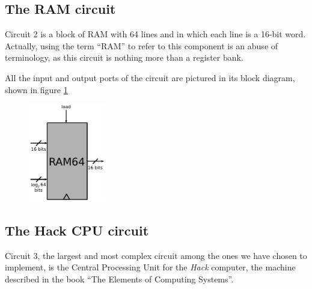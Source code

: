 \documentclass[a4paper]{article}
\begin{document}


        \subsection{The RAM circuit}
        \label{subsec:ram-circuit}
            Circuit 2 is a block of RAM with 64 lines and in which each line is a 16-bit word.
            Actually, using the term ``RAM'' to refer to this component is an abuse of terminology,
            as this circuit is nothing more than a register bank.

            All the input and output ports of the circuit are pictured in its block diagram, shown
            in figure \ref{fig:ram-block}
            \begin{figure}[h]
                \begin{center}
                    \includegraphics[width=0.3\textwidth]{imgs/ram-block.pdf}
                \end{center}
                \label{fig:ram-block}
            \end{figure}

        \subsection{The Hack CPU circuit}
        \label{subsec:hack-cpu-circuit}
            Circuit 3, the largest and most complex circuit among the ones we have chosen to
            implement, is the Central Processing Unit for the \emph{Hack} computer, the machine
            described in the book ``The Elements of Computing Systems''\cite{nand2tetris-book}.
\end{document}
